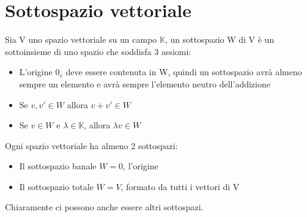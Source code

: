 \documentclass[a4paper, 10pt]{article}
\begin{document}
\section{Sottospazio vettoriale}

Sia V uno spazio vettoriale su un campo $ \mathbb{K} $, un sottospazio W di V è un sottoinsieme di uno spazio che soddisfa 3 assiomi:

\begin{itemize}
	\item L'origine $ 0_v $ deve essere contenuta in W, quindi un sottospazio avrà almeno sempre un elemento e avrà sempre l'elemento neutro dell'addizione
	\item Se $ v, v' \in W $ allora $ v + v' \in W$
	\item Se $ v \in W $ e $ \lambda \in \mathbb{K} $, allora $ \lambda v \in W$
\end{itemize}

Ogni spazio vettoriale ha almeno 2 sottospazi:

\begin{itemize}
	\item Il sottospazio banale $ W = {0} $, l'origine
	\item Il sottospazio totale $ W = V $, formato da tutti i vettori di V
\end{itemize}

Chiaramente ci possono anche essere altri sottospazi.
\end{document}
